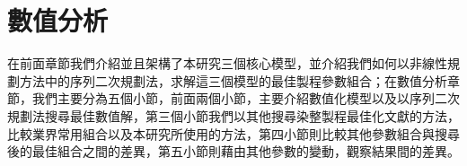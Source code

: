 \chapter{數值分析}
\label{c:numerical}
在前面章節我們介紹並且架構了本研究三個核心模型，並介紹我們如何以非線性規劃方法中的序列二次規劃法，求解這三個模型的最佳製程參數組合；在數值分析章節，我們主要分為五個小節，前面兩個小節，主要介紹數值化模型以及以序列二次規劃法搜尋最佳數值解，第三個小節我們以其他搜尋染整製程最佳化文獻的方法，比較業界常用組合以及本研究所使用的方法，第四小節則比較其他參數組合與搜尋後的最佳組合之間的差異，第五小節則藉由其他參數的變動，觀察結果間的差異。

